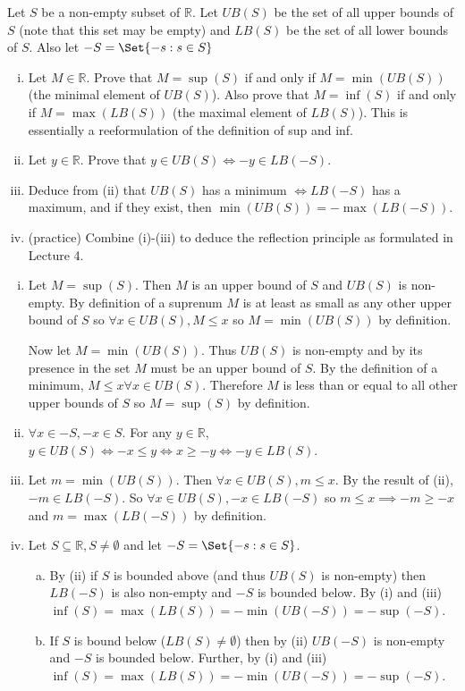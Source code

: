 \documentclass[paper=a4, fontsize=11pt]{jhwhw} %
\begin{document}
Let $S$ be a non-empty subset of $\mathbb R$. Let $UB(S)$ be the set of all upper bounds of $S$ (note that this set may be empty) and $LB(S)$ be the set of all lower bounds of $S$. Also let $-S = \Set{-s:s\in S}$
\begin{enumerate}[(i)]
    \item Let $M\in \mathbb R$. Prove that $M = \sup(S)$ if and only if $M = \min(UB(S))$ (the minimal element of $UB(S)$). Also prove that $M = \inf(S)$ if and only if $M = \max(LB(S))$ (the maximal element of $LB(S)$). This is essentially a reeformulation of the definition of sup and inf.
    \item Let $y\in \mathbb R$. Prove that $y\in UB(S) \iff -y\in LB(-S)$.
    \item Deduce from (ii) that $UB(S)$ has a minimum $\iff LB(-S)$ has a maximum, and if they exist, then $\min(UB(S)) = -\max(LB(-S))$.
    \item (practice) Combine (i)-(iii) to deduce the reflection principle as formulated in Lecture 4.
\end{enumerate}
\solution
\begin{enumerate}[(i)]
    \item Let $M = \sup(S)$. Then $M$ is an upper bound of $S$ and $UB(S)$ is non-empty. By definition of a suprenum $M$ is at least as small as any other upper bound of $S$ so $\forall x \in UB(S), M \le x$ so $M = \min(UB(S))$ by definition.

        Now let $M = \min(UB(S))$. Thus $UB(S)$ is non-empty and by its presence in the set $M$ must be an upper bound of $S$. By the definition of a minimum, $M \le x \forall x\in UB(S)$. Therefore $M$ is less than or equal to all other upper bounds of $S$ so $M=\sup(S)$ by definition.

    \item $\forall x\in -S, -x\in S$. For any $y\in \mathbb R$,  $ y\in UB(S) \iff -x \le y \iff x \ge -y \iff -y\in LB(S)$.

    \item Let $m = \min(UB(S))$. Then $\forall x \in UB(S), m \le x$. By the result of (ii), $-m\in LB(-S)$. So $\forall x\in UB(S), -x \in LB(-S)$ so $m\le x \implies -m \ge -x$ and $m = \max(LB(-S))$ by definition.

    \item Let $S\subseteq \mathbb R, S\not=\emptyset$ and let $-S = \Set{-s:s\in S}$. 
        \begin{enumerate}[(a)]
            \item By (ii) if $S$ is bounded above (and thus $UB(S)$ is non-empty) then $LB(-S)$ is also non-empty and $-S$ is bounded below. By (i) and (iii) $\inf(S) = \max(LB(S)) = -\min(UB(-S)) = -\sup(-S)$.
            \item If $S$ is bound below ($LB(S) \not= \emptyset$) then by (ii) $UB(-S)$ is non-empty and $-S$ is bounded below. Further, by (i) and (iii) $\inf(S) = \max(LB(S)) = -\min(UB(-S)) = -\sup(-S)$.
        \end{enumerate}
\end{enumerate}
\end{document}
